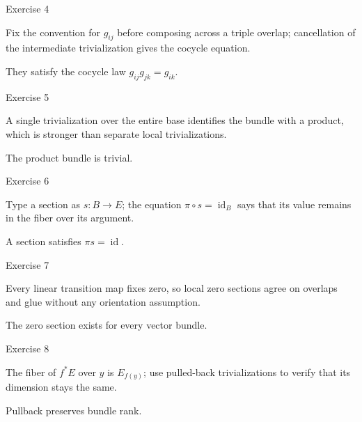 \begin{exercise}\label{exr:viii30-04}
Exercise 4
\end{exercise}
\begin{hint}
Fix the convention for \(g_{ij}\) before composing across a triple overlap; cancellation of the intermediate trivialization gives the cocycle equation.
\end{hint}
\begin{solution}
They satisfy the cocycle law \(g_{ij}g_{jk}=g_{ik}\).
\end{solution}

\begin{exercise}\label{exr:viii30-05}
Exercise 5
\end{exercise}
\begin{hint}
A single trivialization over the entire base identifies the bundle with a product, which is stronger than separate local trivializations.
\end{hint}
\begin{solution}
The product bundle is trivial.
\end{solution}

\begin{exercise}\label{exr:viii30-06}
Exercise 6
\end{exercise}
\begin{hint}
Type a section as \(s:B\to E\); the equation \(\pi\circ s=\operatorname{id}_B\) says that its value remains in the fiber over its argument.
\end{hint}
\begin{solution}
A section satisfies \(\pi s=\operatorname{id}\).
\end{solution}

\begin{exercise}\label{exr:viii30-07}
Exercise 7
\end{exercise}
\begin{hint}
Every linear transition map fixes zero, so local zero sections agree on overlaps and glue without any orientation assumption.
\end{hint}
\begin{solution}
The zero section exists for every vector bundle.
\end{solution}

\begin{exercise}\label{exr:viii30-08}
Exercise 8
\end{exercise}
\begin{hint}
The fiber of \(f^*E\) over \(y\) is \(E_{f(y)}\); use pulled-back trivializations to verify that its dimension stays the same.
\end{hint}
\begin{solution}
Pullback preserves bundle rank.
\end{solution}

